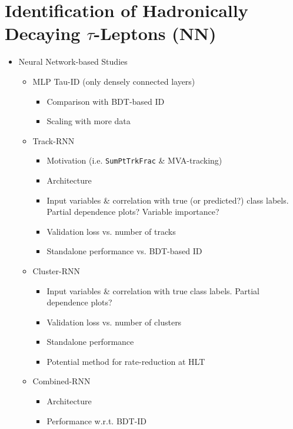 \chapter{Identification of Hadronically Decaying $\tau$-Leptons (NN)}
\label{sec:rnn}

\begin{itemize}
\item Neural Network-based Studies
  \begin{itemize}
  \item MLP Tau-ID (only densely connected layers)
    \begin{itemize}
    \item Comparison with BDT-based ID
    \item Scaling with more data
    \end{itemize}
  \item Track-RNN
    \begin{itemize}
    \item Motivation (i.e. \texttt{SumPtTrkFrac} \& MVA-tracking)
    \item Architecture
    \item Input variables \& correlation with true (or predicted?) class labels.
      Partial dependence plots? Variable importance?
    \item Validation loss vs. number of tracks
    \item Standalone performance vs. BDT-based ID
    \end{itemize}
  \item Cluster-RNN
    \begin{itemize}
    \item Input variables \& correlation with true class labels. Partial
      dependence plots?
    \item Validation loss vs. number of clusters
    \item Standalone performance
    \item Potential method for rate-reduction at HLT
    \end{itemize}
  \item Combined-RNN
    \begin{itemize}
    \item Architecture
    \item Performance w.r.t. BDT-ID
    \end{itemize}
  \end{itemize}
\end{itemize}




















